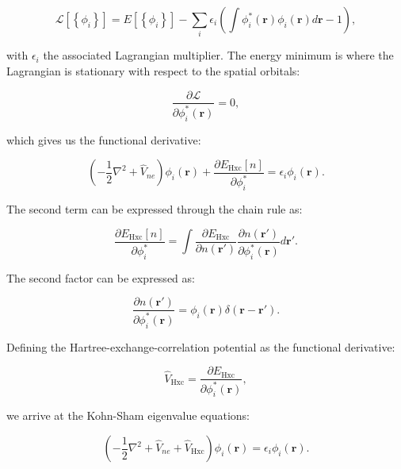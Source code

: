 \begin{equation}
 \mathcal{L} [\left\{\phi_i\right\}]
    = E[\left\{\phi_i\right\}] - \sum_i \epsilon_i
    \left( \int \phi_i^* (\bm{r}) \phi_i(\bm{r}) d\bm{r} - 1 \right) , 
\end{equation}

with $\epsilon_i$ the associated Lagrangian multiplier.
The energy minimum is where the Lagrangian is stationary
with respect to the spatial orbitals:

\begin{equation}
 \frac{\partial \mathcal{L}}{\partial \phi_i^* (\bm{r})} = 0 , 
\end{equation}

which gives us the functional derivative:

\begin{equation}
 \left( -\frac{1}{2} \nabla^2 + \hat{V}_{ne} \right) \phi_i(\bm{r})
    + \frac{\partial E_{\text{Hxc}}[n]}{\partial \phi_i^*} 
    = \epsilon_i \phi_i(\bm{r}) . 
\end{equation}

The second term can be expressed through the chain rule as:

\begin{equation}
 \frac{\partial E_{\text{Hxc}}[n]}{\partial \phi_i^*} =
    \int \frac{\partial E_{\text{Hxc}}}{\partial n(\bm{r}')}
    \frac{\partial n(\bm{r}')}{\partial \phi_i^*(\bm{r})} d\bm{r}' .
\end{equation}

The second factor can be expressed as:

\begin{equation}
 \frac{\partial n(\bm{r}')}{\partial \phi_i^*(\bm{r})}
    = \phi_i(\bm{r}) \delta (\bm{r} - \bm{r}') .
\end{equation}

Defining the Hartree-exchange-correlation potential as the functional
derivative:

\begin{equation}
 \hat{V}_{\text{Hxc}} = \frac{\partial E_{\text{Hxc}}}{\partial
    \phi_i^*(\bm{r})} , 
\end{equation}

we arrive at the Kohn-Sham eigenvalue equations:

\begin{equation}
 \left( -\frac{1}{2} \nabla^2 + \hat{V}_{ne} + \hat{V}_{\text{Hxc}}
    \right) \phi_i(\bm{r}) = \epsilon_i \phi_i (\bm{r}) . 
\end{equation}

